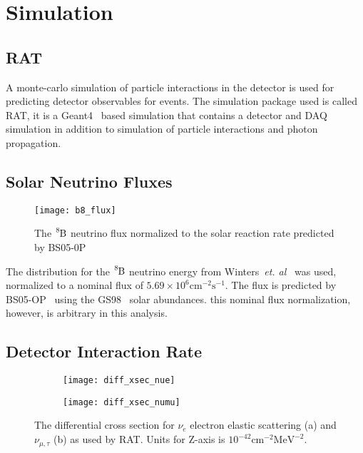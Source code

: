 \section{Simulation}


\subsection{RAT}
A monte-carlo simulation of particle interactions in the detector is used
for predicting detector observables for events.
The simulation package used is called RAT, it is a Geant4~\cite{geant4} based simulation that
contains a detector and DAQ simulation in addition to simulation of particle
interactions and photon propagation.


\subsection{Solar Neutrino Fluxes}
\begin{figure}[htbp]
\centering
\texttt{[image: b8\_flux]}
\caption[Expected $\ce{^{8}B}$ Flux]{The $\ce{^{8}B}$ neutrino flux
normalized to the solar reaction rate predicted by BS05-0P~\cite{bs_ssm}}
\label{fig:b8_flux}
\end{figure}
The distribution for the $\ce{^{8}B}$ neutrino energy from Winters~\textit{et. al}~\cite{winterspectrum}
was used, normalized to a nominal flux of $5.69\times10^{6}\mathrm{cm}^{-2}\mathrm{s}^{-1}$.
The flux is predicted by BS05-OP~\cite{bs_ssm} using the GS98~\cite{gs98} solar
abundances.  this nominal flux normalization, however, is arbitrary in this
analysis.

\subsection{Detector Interaction Rate}
\begin{figure}[htbp]
  \centering
  \begin{subfigure}[b]{0.48\textwidth}
    \centering
  \texttt{[image: diff\_xsec\_nue]}
    \caption[$\nu_{e}$ Differential Cross Section]{}
    \label{fig:diff_xsec_nue}
  \end{subfigure}
  \hfill
  \begin{subfigure}[b]{0.48\textwidth}
    \centering
  \texttt{[image: diff\_xsec\_numu]}
    \caption[$\nu_{\mu}$ Differential Cross Section]{}
    \label{fig:diff_xsec_numu}
  \end{subfigure}
    \caption[ES Differential Cross Section]{The differential cross section for $\nu_{e}$ electron
    elastic scattering (a) and $\nu_{\mu\mathrm{,}\tau}$ (b) as used by
    RAT. Units for Z-axis is $10^{-42} \mathrm{cm}^{-2} \mathrm{MeV}^{-2}$.}
    \label{fig:diff_xsec}
\end{figure}

